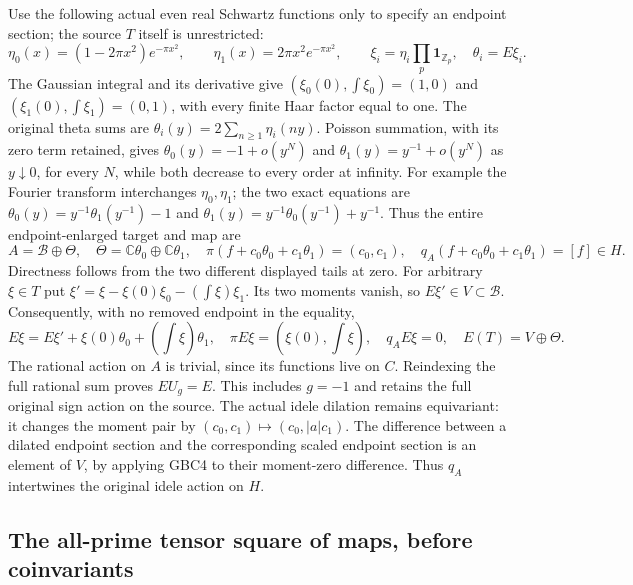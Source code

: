 Use the following actual even real Schwartz functions only to
specify an endpoint section; the source $T$ itself is unrestricted:
\begin{equation}\tag{GBC2}
 \eta_0(x)=(1-2\pi x^2)e^{-\pi x^2},\qquad
 \eta_1(x)=2\pi x^2e^{-\pi x^2},\qquad
 \xi_i=\eta_i\prod_p\mathbf1_{\mathbb Z_p},\quad \theta_i=E\xi_i.
\end{equation}
The Gaussian integral and its derivative give
$(\xi_0(0),\int\xi_0)=(1,0)$ and
$(\xi_1(0),\int\xi_1)=(0,1)$, with every finite Haar factor
equal to one. The original theta sums are
$\theta_i(y)=2\sum_{n\ge1}\eta_i(ny)$.
Poisson summation, with its zero term retained, gives
$\theta_0(y)=-1+o(y^N)$ and
$\theta_1(y)=y^{-1}+o(y^N)$ as $y\downarrow0$, for every
$N$, while both decrease to every order at infinity.
For example the Fourier transform interchanges $\eta_0,\eta_1$;
the two exact equations are
$\theta_0(y)=y^{-1}\theta_1(y^{-1})-1$ and
$\theta_1(y)=y^{-1}\theta_0(y^{-1})+y^{-1}$.
Thus the entire endpoint-enlarged target and map are
\begin{equation}\tag{GBC3}
 A=\mathscr B\oplus\Theta,\quad
 \Theta=\mathbb C\theta_0\oplus\mathbb C\theta_1,\quad
 \pi(f+c_0\theta_0+c_1\theta_1)=(c_0,c_1),\quad
 q_A(f+c_0\theta_0+c_1\theta_1)=[f]\in H.
\end{equation}
Directness follows from the two different displayed tails at zero.
For arbitrary $\xi\in T$ put
$\xi'=\xi-\xi(0)\xi_0-(\int\xi)\xi_1$.
Its two moments vanish, so $E\xi'\in V\subset\mathscr B$.
Consequently, with no removed endpoint in the equality,
\begin{equation}\tag{GBC4}
 E\xi=E\xi'+\xi(0)\theta_0+(\int\xi)\theta_1,
 \quad \pi E\xi=(\xi(0),\int\xi),\quad q_AE\xi=0,
 \quad E(T)=V\oplus\Theta.
\end{equation}
The rational action on $A$ is trivial, since its functions live
on $C$. Reindexing the full rational sum proves $EU_g=E$.
This includes $g=-1$ and retains the full original sign action
on the source. The actual idele dilation remains equivariant:
it changes the moment pair by $(c_0,c_1)\mapsto(c_0,|a|c_1)$.
The difference between a dilated endpoint section and the
corresponding scaled endpoint section is an element of $V$,
by applying GBC4 to their moment-zero difference. Thus $q_A$
intertwines the original idele action on $H$.

\subsection{The all-prime tensor square of maps, before coinvariants}

